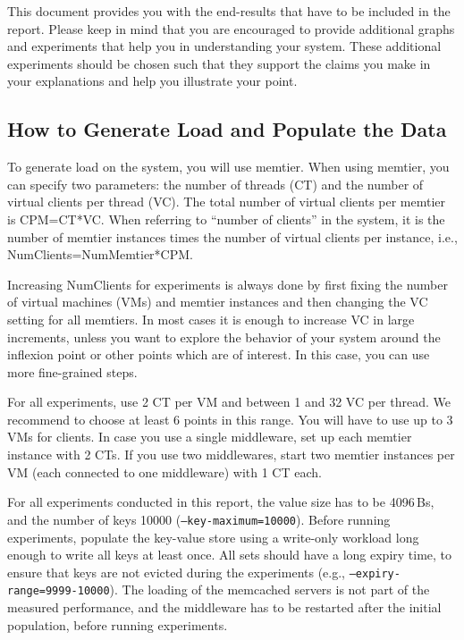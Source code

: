 \documentclass[11pt,a4paper]{article}
\begin{document}
This document provides you with the end-results that have to be included in the report. Please keep in mind that you are encouraged to provide additional graphs and experiments that help you in understanding your system. These additional experiments should be chosen such that they support the claims you make in your explanations and help you illustrate your point.


\subsection*{How to Generate Load and Populate the Data}

To generate load on the system, you will use memtier. When using memtier, you can specify two parameters: the number of threads (CT) and the number of virtual clients per thread (VC). The total number of virtual clients per memtier is CPM=CT*VC. When referring to ``number of clients'' in the system, it is the number of memtier instances times the number of virtual clients per instance, i.e., NumClients=NumMemtier*CPM.

Increasing NumClients for experiments is always done by first fixing the number of virtual machines (VMs) and memtier instances and then changing the VC setting for all memtiers. In most cases it is enough to increase VC in large increments, unless you want to explore the behavior of your system around the inflexion point or other points which are of interest. In this case, you can use more fine-grained steps.

For all experiments, use 2 CT per VM and between 1 and 32 VC per thread. We recommend to choose at least 6 points in this range. You will have to use up to 3 VMs for clients. In case you use a single middleware, set up each memtier instance with 2 CTs. If you use two middlewares, start two memtier instances per VM (each connected to one middleware) with 1 CT each.

For all experiments conducted in this report, the value size has to be 4096\,Bs, and the number of keys 10000 (\texttt{--key-maximum=10000}). Before running experiments, populate the key-value store using a write-only workload long enough to write all keys at least once. All sets should have a long expiry time, to ensure that keys are not evicted during the experiments (e.g., \texttt{--expiry-range=9999-10000}). The loading of the memcached servers is not part of the measured performance, and the middleware has to be restarted after the initial population, before running experiments. 
\end{document}
